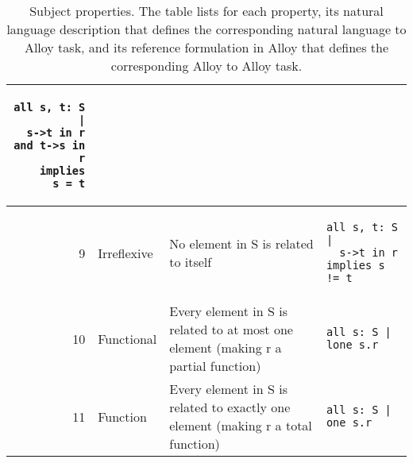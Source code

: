 \begin{table}[!t]
\begin{tabular}{r@{\hskip 0.2cm}|l|p{4cm}|p{5cm}}
\begin{lstlisting}[style=AlloyTable]
all s, t: S |
  s->t in r and t->s in r
    implies s = t
\end{lstlisting} \\
\hline
9 & Irreflexive & No element in S is related to itself &
\begin{lstlisting}[style=AlloyTable]
all s, t: S |
  s->t in r implies s != t
\end{lstlisting} \\
\hline
10 & Functional & Every element in S is related to at most one element (making r a partial function) &
\begin{lstlisting}[style=AlloyTable]
all s: S | lone s.r
\end{lstlisting} \\
\hline
11 & Function & Every element in S is related to exactly one element (making r a total function) &
\begin{lstlisting}[style=AlloyTable]
all s: S | one s.r
\end{lstlisting} \\
\hline
\end{tabular}
\vspace*{2ex}
\caption{Subject properties. The table lists for each property, its
  natural language description that defines the corresponding natural
  language to Alloy task, and its reference formulation in Alloy that
  defines the corresponding Alloy to Alloy
  task.}\label{tab:subjects-synthesis}
\vspace*{-4ex}
\end{table}
